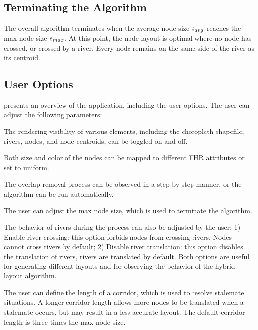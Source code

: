 
\subsection{Terminating the Algorithm}

The overall algorithm terminates when the average node size $ s_{avg} $ reaches the max node size $ s_{max} $. At this point, the node layout is optimal where no node has crossed, or crossed by a river. Every node remains on the same side of the river as its centroid.

\subsection{User Options}

 presents an overview of the application, including the user options. The user can adjust the following parameters:

 The rendering visibility of various elements, including the choropleth shapefile, rivers, nodes, and node centroids, can be toggled on and off.

 Both size and color of the nodes can be mapped to different EHR attributes or set to uniform.

 The overlap removal process can be observed in a step-by-step manner, or the algorithm can be run automatically. 

 The user can adjust the max node size, which is used to terminate the algorithm.

 The behavior of rivers during the process can also be adjusted by the user: 1) Enable river crossing: this option forbids nodes from crossing rivers. Nodes cannot cross rivers by default; 2) Disable river translation: this option disables the translation of rivers, rivers are translated by default. Both options are useful for generating different layouts and for observing the behavior of the hybrid layout algorithm.

 The user can define the length of a corridor, which is used to resolve stalemate situations. A longer corridor length allows more nodes to be translated when a stalemate occurs, but may result in a less accurate layout. The default corridor length is three times the max node size.


